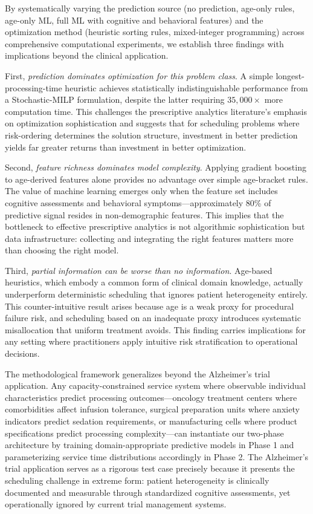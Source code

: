 \documentclass[msom,blindrev]{informs3}
\begin{document}
By systematically varying the prediction source (no prediction, age-only rules, age-only ML, full ML with cognitive and behavioral features) and the optimization method (heuristic sorting rules, mixed-integer programming) across comprehensive computational experiments, we establish three findings with implications beyond the clinical application.

First, \textit{prediction dominates optimization for this problem class}. A simple longest-processing-time heuristic achieves statistically indistinguishable performance from a Stochastic-MILP formulation, despite the latter requiring $35{,}000\times$ more computation time. This challenges the prescriptive analytics literature's emphasis on optimization sophistication and suggests that for scheduling problems where risk-ordering determines the solution structure, investment in better prediction yields far greater returns than investment in better optimization.

Second, \textit{feature richness dominates model complexity}. Applying gradient boosting to age-derived features alone provides no advantage over simple age-bracket rules. The value of machine learning emerges only when the feature set includes cognitive assessments and behavioral symptoms---approximately 80\% of predictive signal resides in non-demographic features. This implies that the bottleneck to effective prescriptive analytics is not algorithmic sophistication but data infrastructure: collecting and integrating the right features matters more than choosing the right model.

Third, \textit{partial information can be worse than no information}. Age-based heuristics, which embody a common form of clinical domain knowledge, actually underperform deterministic scheduling that ignores patient heterogeneity entirely. This counter-intuitive result arises because age is a weak proxy for procedural failure risk, and scheduling based on an inadequate proxy introduces systematic misallocation that uniform treatment avoids. This finding carries implications for any setting where practitioners apply intuitive risk stratification to operational decisions.

The methodological framework generalizes beyond the Alzheimer's trial application. Any capacity-constrained service system where observable individual characteristics predict processing outcomes---oncology treatment centers where comorbidities affect infusion tolerance, surgical preparation units where anxiety indicators predict sedation requirements, or manufacturing cells where product specifications predict processing complexity---can instantiate our two-phase architecture by training domain-appropriate predictive models in Phase 1 and parameterizing service time distributions accordingly in Phase 2. The Alzheimer's trial application serves as a rigorous test case precisely because it presents the scheduling challenge in extreme form: patient heterogeneity is clinically documented and measurable through standardized cognitive assessments, yet operationally ignored by current trial management systems.
\end{document}
